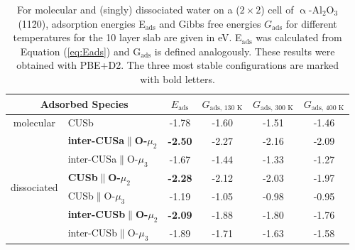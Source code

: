\documentclass[11pt,DIV=13,BCOR=5mm,a4paper,headinclude]{scrbook}
\begin{document}
\begin{table}[!ht]
  \centering
 \caption{For molecular and (singly) dissociated water on a ($2\times 2$) cell of $\upalpha$-Al$_2$O$_3$(11\=20), adsorption energies E$_\textrm{ads}$ and Gibbs free energies $G_\textrm{ads}$ for different temperatures for the 10 layer slab are given in eV.
E$_\textrm{ads}$ was calculated from Equation (\ref{eq:Eads}) and G$_\textrm{ads}$ is defined analogously.
These results were obtained with PBE+D2.
The three most stable configurations are marked with bold letters.
\vspace*{.2cm} 
  }
  \begin{tabular}{cl|cccc}
  \toprule
   \multicolumn{2}{c|}{Adsorbed Species}  & $E_\textrm{ads}$ & $G_\text{ads, 130 K}$  &  $G_\text{ads, 300 K}$  & $G_\text{ads, 400 K}$ \\\midrule
\multirow{1}{*}{molecular} & CUSb          &   -1.78  &-1.60 & -1.51  & -1.46 \\\hline
 \multirow{6}{*}{dissociated} & \textbf{inter-CUSa$\parallel$O-$\mu_2$} & \textbf{-2.50} &-2.27 & -2.16 & -2.09 \\
  & inter-CUSa$\parallel$O-$\mu_3$ & -1.67 &-1.44 &-1.33 & -1.27 \\
  & \textbf{CUSb$\parallel$O-$\mu_2$} & \textbf{-2.28} & -2.12& -2.03 &-1.97  \\
 & CUSb$\parallel$O-$\mu_3$ & -1.19 &-1.05 &-0.98 & -0.95 \\%
 & \textbf{inter-CUSb$\parallel$O-$\mu_2$} & \textbf{-2.09} &-1.88 &-1.80 & -1.76 \\
 & inter-CUSb$\parallel$O-$\mu_3$ & -1.89 &-1.71 & -1.63 & -1.58 \\\bottomrule
  \end{tabular}
  \label{tab:ads_1water}
\end{table}
\end{document}
